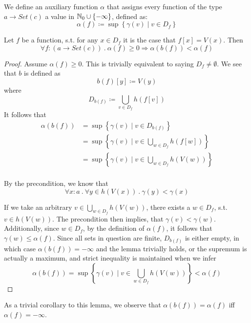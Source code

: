 

We define an auxiliary function $\alpha$ that assigns every function of the type $a \to Set(c)$ a value in $\mathbb N_0 \cup \{-\infty\}$, defined as:
\[
\alpha(f) \coloneqq \sup\left\{ \gamma(v) \mid v \in D_f \right\}
\]

\begin{lemma}\label{lemma2}
Let $f$ be a function, s.t. for any $x \in D_f$ it is the case that $f[x] = V(x)$. Then
\[
\forall f\colon (a \to Set(c)) \ .\ \alpha(f) \ge 0 \Rightarrow \alpha(b(f)) < \alpha(f)
\]
\end{lemma}

\begin{proof}
Assume $\alpha(f) \ge 0$. This is trivially equivalent to saying $D_f \ne \emptyset$.
We see that $b$ is defined as
\[
b(f)[y] \coloneqq V(y)
\]
where 
\[
D_{b(f)} \coloneqq \bigcup_{v \in D_f} h(f[v])
\]
It follows that 
\begin{align*} 
\alpha(b(f)) &= \sup\left\{ \gamma(v) \mid v \in D_{b(f)} \right\} \\
&= \sup\left\{ \gamma(v) \mid v \in \bigcup_{w \in D_f} h(f[w]) \right\} \\
&= \sup\left\{ \gamma(v) \mid v \in \bigcup_{w \in D_f} h(V(w)) \right\} \\
\end{align*}

By the precondition, we know that 
\[
\forall x\colon a \ .\ \forall y \in h(V(x)) \ .\ \gamma(y) < \gamma(x) 
\]

If we take an arbitrary $v \in \bigcup_{w \in D_f} h(V(w))$, there exists a
$w \in D_f$, s.t. $v \in h(V(w))$. The precondition then implies, that $\gamma(v) < \gamma(w)$.
Additionally, since $w \in D_f$, by the definition of $\alpha(f)$, it follows that $\gamma(w) \le \alpha(f)$.
Since all sets in question are finite, $D_{b(f)}$ is either empty, in which case $\alpha(b(f)) = -\infty$ and the lemma trivially holds, or the supremum is actually a maximum, and strict inequality is maintained when we infer
\[
\alpha(b(f)) = \sup\left\{ \gamma(v) \mid v \in \bigcup_{w \in D_f} h(V(w)) \right\} < \alpha(f)
\]
\end{proof}
As a trivial corollary to this lemma, we observe that $\alpha(b(f)) = \alpha(f)$ iff $\alpha(f) = -\infty$.


